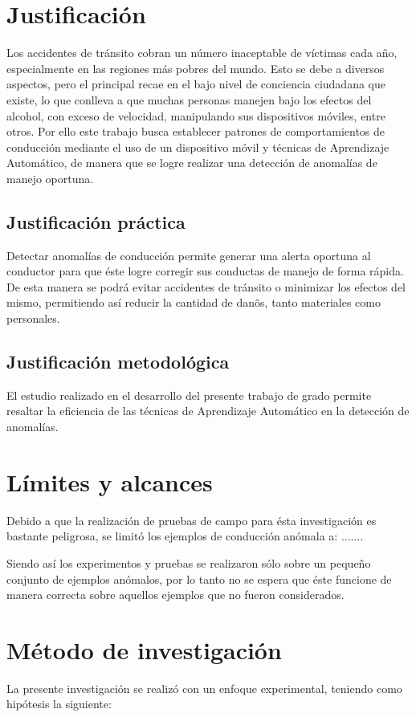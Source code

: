 
\section{Justificación}

Los accidentes de tránsito cobran un número inaceptable de víctimas cada a\~{n}o, especialmente en las regiones m\'{a}s pobres del mundo. Esto se debe a diversos aspectos, pero el principal recae en el bajo nivel de conciencia ciudadana que existe, lo que conlleva a que muchas personas manejen bajo los efectos del alcohol, con exceso de velocidad, manipulando sus dispositivos m\'{o}viles, entre otros. Por ello este trabajo busca establecer patrones de comportamientos de conducci\'{o}n mediante el uso de un dispositivo m\'{o}vil y t\'{e}cnicas de Aprendizaje Autom\'{a}tico, de manera que se logre realizar una detecci\'{o}n de anomal\'{i}as de manejo oportuna.

\subsection{Justificaci\'{o}n pr\'{a}ctica}

Detectar anomal\'{i}as de conducci\'{o}n permite generar una alerta oportuna al conductor para que \'{e}ste logre corregir sus conductas de manejo de forma r\'{a}pida. De esta manera se podr\'{a} evitar accidentes de tr\'{a}nsito o minimizar los efectos del mismo, permitiendo as\'{i} reducir la cantidad de dan\~{o}s, tanto materiales como personales.

\subsection{Justificaci\'{o}n metodol\'{o}gica}

El estudio realizado en el desarrollo del presente trabajo de grado permite resaltar la eficiencia de las t\'{e}cnicas de Aprendizaje Autom\'{a}tico en la detecci\'{o}n de anomal\'{i}as.

\section{L\'{i}mites y alcances}

Debido a que la realizaci\'{o}n de pruebas de campo para \'{e}sta investigaci\'{o}n es bastante peligrosa, se limit\'{o} los ejemplos de conducci\'{o}n an\'{o}mala a: .......

\vspace{5mm} %

Siendo as\'{i} los experimentos y pruebas se realizaron s\'{o}lo sobre un peque\~{n}o conjunto de ejemplos an\'{o}malos, por lo tanto no se espera que \'{e}ste funcione de manera correcta sobre aquellos ejemplos que no fueron considerados.

\section{M\'{e}todo de investigaci\'{o}n}

La presente investigaci\'{o}n se realiz\'{o} con un enfoque experimental, teniendo como hip\'{o}tesis la siguiente:

